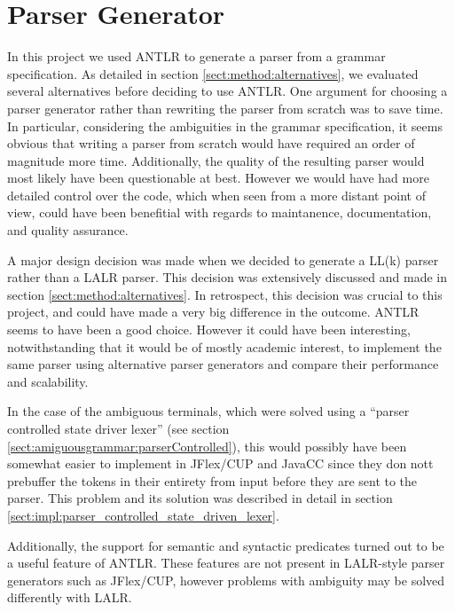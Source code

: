\section{Parser Generator}
\label{sect:discussion:antlr}
In this project we used ANTLR to generate a parser from a grammar
specification. As detailed in section \ref{sect:method:alternatives}, we
evaluated several alternatives before deciding to use ANTLR. One argument for
choosing a parser generator rather than rewriting the parser from scratch was to
save time. In particular, considering the ambiguities in the grammar
specification, it seems obvious that writing a parser from scratch would
have required an order of magnitude more time. Additionally, the quality of the
resulting parser would most likely have been questionable at best. However
we would have had more detailed control over the code, which when seen from a
more distant point of view, could have been benefitial with regards to
maintanence, documentation, and quality assurance.

A major design decision was made when we decided to generate a LL(k) parser rather
than a LALR parser. This decision was extensively discussed and made in
section \ref{sect:method:alternatives}. In retrospect, this decision was
crucial to this project, and could have made a very big difference in the
outcome. ANTLR seems to have been a good choice. However it could have been
interesting, notwithstanding that it would be of mostly academic interest, to  
implement the same parser using alternative parser generators and compare their
performance and scalability.

In the case of the ambiguous terminals, which were solved using a ``parser
controlled state driver lexer'' (see section 
\ref{sect:amiguousgrammar:parserControlled}), this would possibly have been
somewhat easier to implement in JFlex/CUP and JavaCC since they don nott prebuffer 
the tokens in their entirety from input before they are sent to the parser. This
problem and its solution was described in detail in section
\ref{sect:impl:parser_controlled_state_driven_lexer}.

Additionally, the support for semantic and syntactic predicates turned out to be
a useful feature of ANTLR. These features are not present in LALR-style parser
generators such as JFlex/CUP, however problems with ambiguity may be solved
differently with LALR.